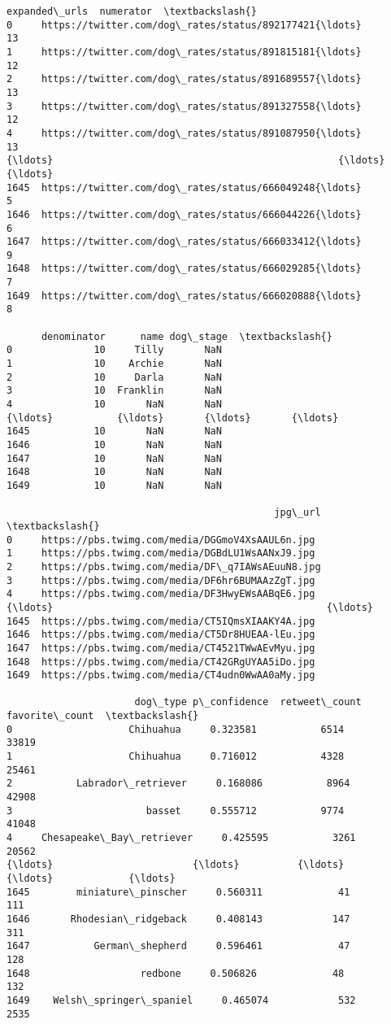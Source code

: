 \documentclass[11pt]{article}
\begin{document}
\begin{tcolorbox}[breakable, size=fbox, boxrule=.5pt, pad at break*=1mm, opacityfill=0]
\begin{Verbatim}[commandchars=\\\{\}]
                                          expanded\_urls  numerator  \textbackslash{}
0     https://twitter.com/dog\_rates/status/892177421{\ldots}         13
1     https://twitter.com/dog\_rates/status/891815181{\ldots}         12
2     https://twitter.com/dog\_rates/status/891689557{\ldots}         13
3     https://twitter.com/dog\_rates/status/891327558{\ldots}         12
4     https://twitter.com/dog\_rates/status/891087950{\ldots}         13
{\ldots}                                                 {\ldots}        {\ldots}
1645  https://twitter.com/dog\_rates/status/666049248{\ldots}          5
1646  https://twitter.com/dog\_rates/status/666044226{\ldots}          6
1647  https://twitter.com/dog\_rates/status/666033412{\ldots}          9
1648  https://twitter.com/dog\_rates/status/666029285{\ldots}          7
1649  https://twitter.com/dog\_rates/status/666020888{\ldots}          8

      denominator      name dog\_stage  \textbackslash{}
0              10     Tilly       NaN
1              10    Archie       NaN
2              10     Darla       NaN
3              10  Franklin       NaN
4              10       NaN       NaN
{\ldots}           {\ldots}       {\ldots}       {\ldots}
1645           10       NaN       NaN
1646           10       NaN       NaN
1647           10       NaN       NaN
1648           10       NaN       NaN
1649           10       NaN       NaN

                                              jpg\_url  \textbackslash{}
0     https://pbs.twimg.com/media/DGGmoV4XsAAUL6n.jpg
1     https://pbs.twimg.com/media/DGBdLU1WsAANxJ9.jpg
2     https://pbs.twimg.com/media/DF\_q7IAWsAEuuN8.jpg
3     https://pbs.twimg.com/media/DF6hr6BUMAAzZgT.jpg
4     https://pbs.twimg.com/media/DF3HwyEWsAABqE6.jpg
{\ldots}                                               {\ldots}
1645  https://pbs.twimg.com/media/CT5IQmsXIAAKY4A.jpg
1646  https://pbs.twimg.com/media/CT5Dr8HUEAA-lEu.jpg
1647  https://pbs.twimg.com/media/CT4521TWwAEvMyu.jpg
1648  https://pbs.twimg.com/media/CT42GRgUYAA5iDo.jpg
1649  https://pbs.twimg.com/media/CT4udn0WwAA0aMy.jpg

                      dog\_type p\_confidence  retweet\_count  favorite\_count  \textbackslash{}
0                    Chihuahua     0.323581           6514           33819
1                    Chihuahua     0.716012           4328           25461
2           Labrador\_retriever     0.168086           8964           42908
3                       basset     0.555712           9774           41048
4     Chesapeake\_Bay\_retriever     0.425595           3261           20562
{\ldots}                        {\ldots}          {\ldots}            {\ldots}             {\ldots}
1645        miniature\_pinscher     0.560311             41             111
1646       Rhodesian\_ridgeback     0.408143            147             311
1647           German\_shepherd     0.596461             47             128
1648                   redbone     0.506826             48             132
1649    Welsh\_springer\_spaniel     0.465074            532            2535


\end{Verbatim}
\end{tcolorbox}
\end{document}
